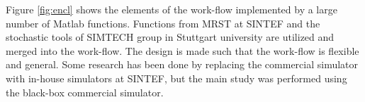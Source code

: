 Figure \ref{fig:encl} shows the elements of the work-flow implemented by a large
number of Matlab functions. Functions from MRST at SINTEF and the stochastic
tools of SIMTECH group in Stuttgart university are utilized and merged into the
work-flow. The design is made such that the work-flow is flexible and general.
Some research has been done by replacing the commercial simulator with in-house
simulators at SINTEF, but the main study was performed using the black-box
commercial simulator. 
